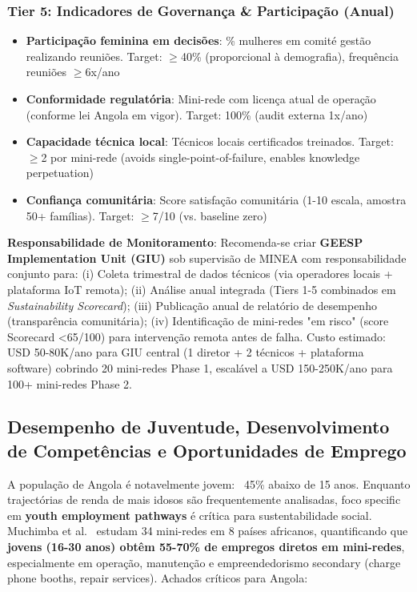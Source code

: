 \documentclass[12pt, a4paper]{article}
\begin{document}
\subsubsection{Tier 5: Indicadores de Governança \& Participação (Anual)}
\begin{itemize}
\item \textbf{Participação feminina em decisões}: \% mulheres em comité gestão realizando reuniões. Target: $\geq$40\% (proporcional à demografia), frequência reuniões $\geq$6x/ano
\item \textbf{Conformidade regulatória}: Mini-rede com licença atual de operação (conforme lei Angola em vigor). Target: 100\% (audit externa 1x/ano)
\item \textbf{Capacidade técnica local}: Técnicos locais certificados treinados. Target: $\geq$2 por mini-rede (avoids single-point-of-failure, enables knowledge perpetuation)
\item \textbf{Confiança comunitária}: Score satisfação comunitária (1-10 escala, amostra 50+ famílias). Target: $\geq$7/10 (vs. baseline zero)
\end{itemize}


\textbf{Responsabilidade de Monitoramento}: Recomenda-se criar 
\textbf{GEESP Implementation Unit (GIU)} sob supervisão de MINEA com responsabilidade conjunto para: (i) Coleta trimestral de dados técnicos (via operadores locais + plataforma IoT remota); (ii) Análise anual integrada (Tiers 1-5 combinados em \textit{Sustainability Scorecard}); (iii) Publicação anual de relatório de desempenho (transparência comunitária); (iv) Identificação de mini-redes "em risco" (score Scorecard <65/100) para intervenção remota antes de falha. Custo estimado: USD 50-80K/ano para GIU central (1 diretor + 2 técnicos + plataforma software) cobrindo 20 mini-redes Phase 1, escalável a USD 150-250K/ano para 100+ mini-redes Phase 2.

\subsection{Desempenho de Juventude, Desenvolvimento de Competências e Oportunidades de Emprego}

A população de Angola é notavelmente jovem: ~45\% abaixo de 15 anos. Enquanto trajectórias de renda de mais idosos são frequentemente analisadas, foco specific em 
\textbf{youth employment pathways} é crítica para sustentabilidade social. Muchimba et al.~\citep{Muchimba2025} estudam 34 mini-redes em 8 países africanos, quantificando que 
\textbf{jovens (16-30 anos) obtêm 55-70\% de empregos diretos em mini-redes}, especialmente em operação, manutenção e empreendedorismo secondary (charge phone booths, repair services). Achados críticos para Angola:
\end{document}
